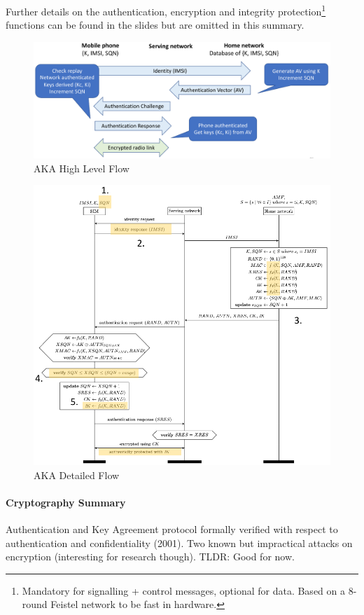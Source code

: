 Further details on the authentication, encryption and integrity
protection\footnote{Mandatory for signalling + control messages, optional for
	data. Based on a 8-round Feistel network to be fast in hardware.} functions can
be found in the slides but are omitted in this summary.%

\begin{figure}[h]
	\centering
	\includegraphics[scale=0.4]{images/10-3g-aka-overview.png}
	\caption{AKA High Level Flow}
	\label{fig:3g-aka-overview}
\end{figure}

\begin{figure}[h]
	\centering
	\includegraphics[scale=0.7]{images/10-3g-aka-details.png}
	\caption{AKA Detailed Flow}
	\label{fig:3g-aka-details}
\end{figure}

\paragraph{Cryptography Summary}
Authentication and Key Agreement protocol formally verified with respect to
authentication and confidentiality (2001). Two known but impractical attacks on
encryption (interesting for research though). TLDR: Good for now.

